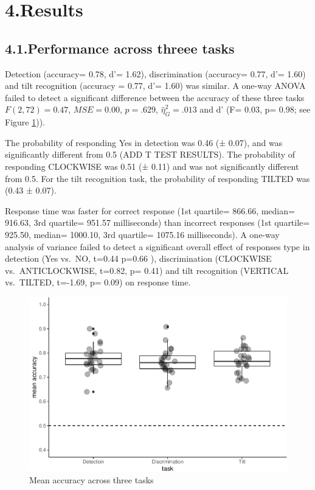\documentclass[]{article}
\begin{document}
\hypertarget{results}{%
\section{4.Results}\label{results}}

\hypertarget{performance-across-threee-tasks}{%
\subsection{4.1.Performance across threee
tasks}\label{performance-across-threee-tasks}}

Detection (accuracy= 0.78, d'= 1.62), discrimination (accuracy= 0.77,
d'= 1.60) and tilt recognition (accuracy = 0.77, d'= 1.60) was similar.
A one-way ANOVA failed to detect a significant difference between the
accuracy of these three tasks \(F(2, 72) = 0.47\),
\(\mathit{MSE} = 0.00\), \(p = .629\), \(\hat{\eta}^2_G = .013\) and d'
(F= 0.03, p= 0.98; see Figure \ref{fig:accuracy})).

The probability of responding Yes in detection was 0.46 (± 0.07), and
was significantly different from 0.5 (ADD T TEST RESULTS). The
probability of responding CLOCKWISE was 0.51 (± 0.11) and was not
significantly different from 0.5. For the tilt recognition task, the
probability of responding TILTED was (0.43 ± 0.07).

Response time was faster for correct response (1st quartile= 866.66,
median= 916.63, 3rd quartile= 951.57 milliseconds) than incorrect
responses (1st quartile= 925.50, median= 1000.10, 3rd quartile= 1075.16
milliseconds). A one-way analysis of variance failed to detect a
significant overall effect of responses type in detection (Yes vs.~NO,
t=0.44 p=0.66 ), discrimination (CLOCKWISE vs.~ANTICLOCKWISE, t=0.82, p=
0.41) and tilt recognition (VERTICAL vs.~TILTED, t=-1.69, p= 0.09) on
response time.

\begin{figure}
\centering
\includegraphics{Chudi-Thesis_files/figure-latex/accuracy_figure-1.pdf}
\caption{\label{fig:accuracy} Mean accuracy across three tasks}
\end{figure}
\end{document}
